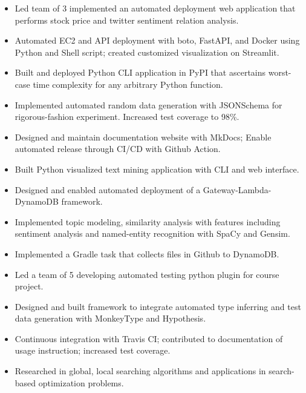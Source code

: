 \begin{itemize}
\item Led team of 3 implemented an automated deployment web application that performs stock price and twitter sentiment relation analysis.
\item Automated EC2 and API deployment with boto, FastAPI, and Docker using Python and Shell script; created customized visualization on Streamlit.
\end{itemize}
\smallskip
{}
\begin{itemize}
\item Built and deployed Python CLI application in PyPI that ascertains worst-case time complexity for any arbitrary Python function.
\item Implemented automated random data generation with JSONSchema for rigorous-fashion experiment. Increased test coverage to 98\%.
\item Designed and maintain documentation website with MkDocs; Enable automated release through CI/CD with Github Action.
\end{itemize}
\smallskip
{}
\begin{itemize}
\item Built Python visualized text mining application with CLI and web interface.
\item Designed and enabled automated deployment of a Gateway-Lambda-DynamoDB framework.
\item Implemented topic modeling, similarity analysis with features including sentiment analysis and named-entity recognition with SpaCy and Gensim.
\item Implemented a Gradle task that collects files in Github to DynamoDB.
\end{itemize}
\smallskip
{}
\begin{itemize}
\item Led a team of 5 developing automated testing python plugin for course project.
\item Designed and built framework to integrate automated type inferring and test data generation with MonkeyType and Hypothesis.
\end{itemize}
\smallskip
{}
\begin{itemize}
\item Continuous integration with Travis CI; contributed to documentation of usage instruction; increased test coverage.
\item Researched in global, local searching algorithms and applications in search-based optimization problems.
\end{itemize}

